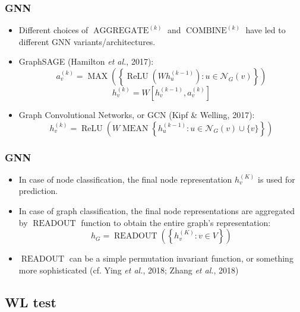 \documentclass{beamer}
\DeclareMathOperator{\aggregate}{AGGREGATE}
\DeclareMathOperator{\combine}{COMBINE}
\DeclareMathOperator{\readout}{READOUT}
\DeclareMathOperator{\MAX}{MAX}
\DeclareMathOperator{\MEAN}{MEAN}
\DeclareMathOperator{\relu}{ReLU}
\begin{document}
\begin{frame}
\frametitle{GNN}

\begin{itemize}
	\item Different choices of $\aggregate^{(k)}$ and $\combine^{(k)}$ have led to different GNN variants/architectures. \pause
	
	\item GraphSAGE (Hamilton {\it et al.}, 2017):
	$$a_v^{(k)} = \MAX \left( \left\{ \relu \left( W h_u^{(k - 1)} \right) : u \in \mathcal{N}_G(v) \right\} \right)$$
	$$h_v^{(k)} = W \left[ h_v^{(k - 1)}, a_v^{(k)} \right]$$ \pause
	
	\item Graph Convolutional Networks, or GCN (Kipf \& Welling, 2017):
	$$h_v^{(k)} = \relu \left( W \MEAN \left\{ h_u^{(k - 1)} : u \in \mathcal{N}_G(v) \cup \{v\} \right\} \right)$$
\end{itemize}

\end{frame}

\begin{frame}
\frametitle{GNN}

\begin{itemize}
	\item In case of node classification, the final node representation $h_v^{(K)}$ is used for prediction. \pause
	
	\item In case of graph classification, the final node representations are aggregated by $\readout$ function to obtain the entire graph's representation:
	$$h_G = \readout \left( \left\{ h_v^{(K)} : v \in V \right\} \right)$$ \pause
	
	\item $\readout$ can be a simple permutation invariant function, or something more sophisticated (cf. Ying {\it et al.}, 2018; Zhang {\it et al.}, 2018)
\end{itemize}

\end{frame}


\subsection{WL test}
\end{document}
